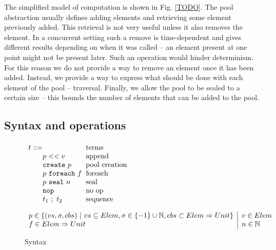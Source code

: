 \documentclass[runningheads,a4paper]{llncs}
\newcommand{\gap}{\quad\quad}
\newcommand{\set}[1]{\{#1\}}
\newcommand{\ba}{\begin{array}}
\newcommand{\ea}{\end{array}}
\begin{document}
The simplified model of computation is shown in Fig. \ref{TODO}.
The pool abstraction usually defines adding elements and retrieving
some element previously added.
This retrieval is not very useful unless it also removes the element.
In a concurrent setting such a remove is time-dependent and gives
different results depending on when it was called -- an element
present at one point might not be present later.
Such an operation would hinder determinism.
For this reason we do not provide a way to remove an element once it
has been added.
Instead, we provide a way to express what should be done with each
element of the pool -- traversal.
Finally, we allow the pool to be sealed to a certain size -- this
bounds the number of elements that can be added to the pool.

\subsection{Syntax and operations}

\smallrulenames

\begin{figure}[t]


$\ba[t]{l@{\hspace{2mm}}l}
t    ::=                                                           & \mbox{terms}              \\
\gap p << v                                                  & \mbox{append}           \\
\gap \texttt{create}~p                                   & \mbox{pool creation}  \\
\gap p~\texttt{foreach}~f                             & \mbox{foreach}           \\
\gap p~\texttt{seal}~n                                  & \mbox{seal}                \\
\gap \texttt{nop}                                          & \mbox{no op}              \\
\gap t_1~;~t_2                                               & \mbox{sequence}        \\
\ea$

$\ba{l@{\hspace{2mm}}|@{\hspace{2mm}}l@{\hspace{2mm}}l}
p \in \set{(vs, \sigma, cbs)~|~vs \subseteq Elem, \sigma \in \set{-1} \cup \mathbb{N}, cbs \subset Elem \Rightarrow Unit} & v \in Elem \\
f \in Elem \Rightarrow Unit & n \in \mathbb{N}
\ea$


\caption{Syntax}\label{fig:syntax}
\end{figure}
\end{document}
